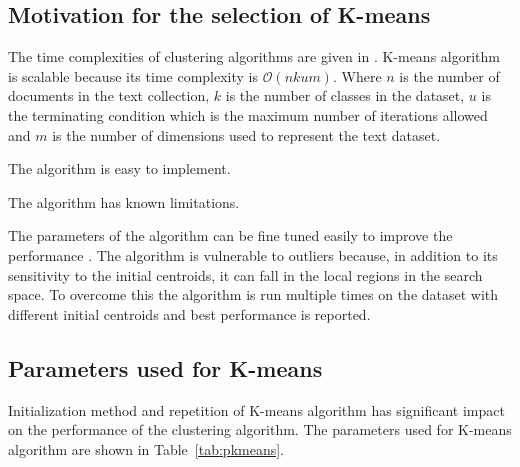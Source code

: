 \subsection{Motivation for the selection of K-means}
\begin{inparaenum}
\item The time complexities of clustering algorithms are given in \cite{xu2015}. K-means algorithm is scalable because its time complexity is $\mathcal{O}(nkum)$. Where $n$ is the number of documents in the text collection, $k$ is the number of classes in the dataset, $u$ is the terminating condition which is the maximum number of iterations allowed and $m$ is the number of dimensions used to represent the text dataset. 
\item The algorithm is easy to implement. 
\item The algorithm has known limitations. 
\item The parameters of the algorithm can be fine tuned easily to improve the performance \cite{franti2018}. The algorithm is vulnerable to outliers because, in addition to its sensitivity to the initial centroids, it can fall in the local regions in
the search space. To overcome this the algorithm is run multiple times on the dataset with different initial centroids and best performance is reported.

\end{inparaenum}
 
\subsection{Parameters used for K-means}

Initialization method and repetition of K-means algorithm has significant impact on the performance of the clustering algorithm.
The parameters used for K-means algorithm are shown in Table~\ref{tab:pkmeans}. 

